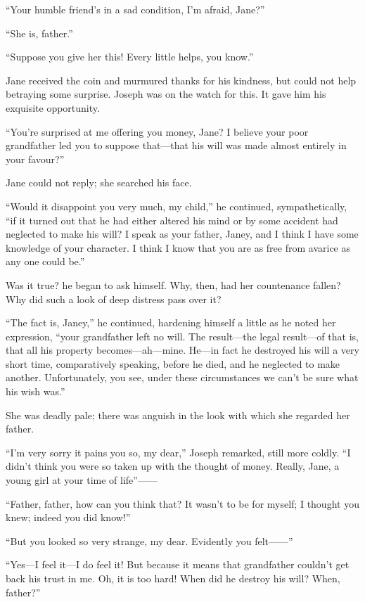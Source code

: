 ``Your humble friend's in a sad condition, I'm afraid, Jane?''

``She is, father.''

``Suppose you give her this! Every little helps, you know.''

Jane received the coin and murmured thanks for his kindness, but could
not help betraying some surprise. Joseph was on the watch for this. It
gave him his exquisite opportunity.

``You're surprised at me offering you money, Jane? I believe your poor
grandfather led you to suppose that---that his will was made almost
entirely in your favour?''

Jane could not reply; she searched his face.

``Would it disappoint you very much, my child,'' he continued,
sympathetically, ``if it turned out that he had either altered his mind
{}or by some accident had neglected to make his will? I speak as your
father, Janey, and I think I have some knowledge of your character. I
think I know that you are as free from avarice as any one could be.''

Was it true? he began to ask himself. Why, then, had her countenance
fallen? Why did such a look of deep distress pass over it?

``The fact is, Janey,'' he continued, hardening himself a little as he
noted her expression, ``your grandfather left no will. The result---the
legal result---of that is, that all his property becomes---ah---mine.
He---in fact he destroyed his will a very short time, comparatively
speaking, before he died, and he neglected to make another.
Unfortunately, you see, under these circumstances we can't be sure what
his wish was.''

She was deadly pale; there was anguish in the look with which she
regarded her father.

``I'm very sorry it pains you so, my dear,'' Joseph remarked, still more
coldly. ``I didn't think you were so taken up with the thought of money.
Really, Jane, a young girl at your time of life''{{------}}

``Father, father, how can you think that? {}It wasn't to be for myself;
I thought you knew; indeed you did know!''

``But you looked so very strange, my dear. Evidently you
felt{{------}}''

``Yes---I feel it---I do feel it! But because it means that grandfather
couldn't get back his trust in me. Oh, it is too hard! When did he
destroy his will? When, father?''

